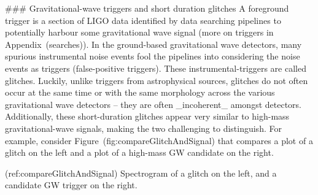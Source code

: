 ### Gravitational-wave triggers and short duration glitches
A foreground trigger is a section of LIGO data identified by data searching pipelines to potentially harbour some
gravitational wave signal (more on triggers in Appendix~\@ref(searches)). In the ground-based gravitational wave
detectors, many spurious instrumental noise events fool the pipelines into considering the noise events as triggers
(false-positive triggers). These instrumental-triggers are called glitches. Luckily, unlike triggers from astrophysical
sources, glitches do not often occur at the same time or with the same morphology across the various gravitational wave
detectors -- they are often _incoherent_ amongst detectors. Additionally, these short-duration glitches appear very
similar to high-mass gravitational-wave signals, making the two challenging to distinguish. For example, consider
Figure~\@ref(fig:compareGlitchAndSignal) that compares a plot of a glitch on the left and a plot of a high-mass GW
candidate on the right.


(ref:compareGlitchAndSignal) Spectrogram of a glitch on the left, and a candidate GW trigger on the right.

